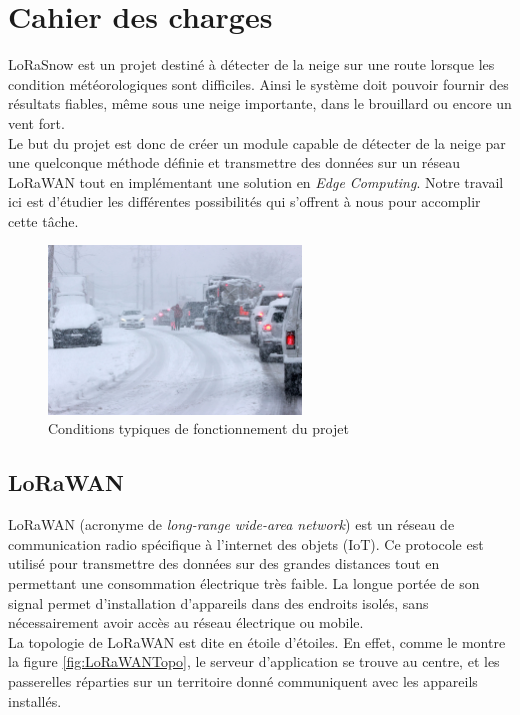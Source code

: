 \section{Cahier des charges}

LoRaSnow est un projet destiné à détecter de la neige sur une route lorsque les condition 
météorologiques sont difficiles. Ainsi le système doit pouvoir fournir des résultats fiables,
même sous une neige importante, dans le brouillard ou encore un vent fort.\\
Le but du projet est donc de créer un module capable de détecter de la neige par une quelconque méthode 
définie et transmettre des données sur un réseau LoRaWAN tout en implémentant une solution en 
\emph{Edge Computing}. Notre travail ici est d'étudier les différentes possibilités qui s'offrent à nous 
pour accomplir cette tâche.

\begin{figure}[H]
    \centering
    \includegraphics[width=0.6\textwidth]{Images/Illustration/ConditionDifficiles.jpg}
    \caption[]{Conditions typiques de fonctionnement du projet\footnotemark[1]}
    \label{fig:ConditionDifficiles}
\end{figure}


\newpage

\subsection{LoRaWAN}
LoRaWAN (acronyme de \emph{long-range wide-area network}) est un réseau de communication radio spécifique
à l'internet des objets (IoT). Ce protocole est utilisé pour transmettre des données sur des grandes 
distances tout en permettant une consommation électrique très faible. La longue portée de son signal 
permet d'installation d'appareils dans des endroits isolés, sans nécessairement avoir accès au réseau 
électrique ou mobile.\\
La topologie de LoRaWAN est dite en étoile d'étoiles. En effet, comme le montre la figure \ref{fig:LoRaWANTopo},
le serveur d'application se trouve au centre, et les passerelles réparties sur un territoire donné 
communiquent avec les appareils installés.

